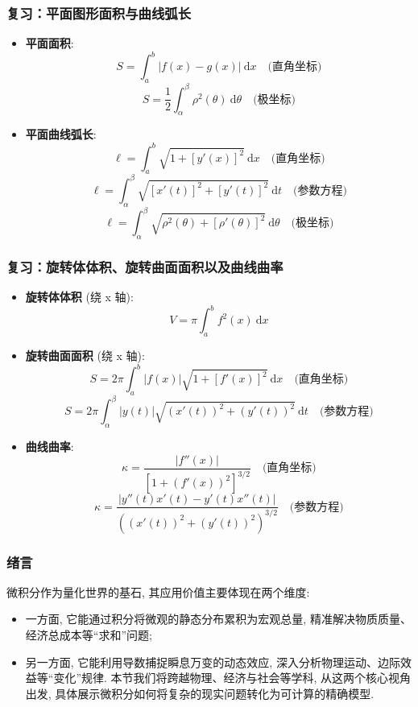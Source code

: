 \begin{frame}
\frametitle{复习：平面图形面积与曲线弧长}
\begin{itemize}
\item \textbf{平面面积}:
\[ S = \int_a^b |f(x)-g(x)| ~ \mathrm{d}x \quad \text{(直角坐标)} \]
\[ S = \frac{1}{2} \int_\alpha^\beta \rho^2(\theta) ~ \mathrm{d}\theta \quad \text{(极坐标)} \]
\item \textbf{平面曲线弧长}:
\[ \ell = \int_a^b \sqrt{1+[y'(x)]^2} ~ \mathrm{d}x \quad \text{(直角坐标)} \]
\[ \ell = \int_\alpha^\beta \sqrt{[x'(t)]^2+[y'(t)]^2} ~ \mathrm{d}t \quad \text{(参数方程)} \]
\[ \ell = \int_\alpha^\beta \sqrt{\rho^2(\theta)+[\rho'(\theta)]^2} ~ \mathrm{d}\theta \quad \text{(极坐标)} \]
\end{itemize}
\end{frame}


\begin{frame}
\frametitle{复习：旋转体体积、旋转曲面面积以及曲线曲率}
\begin{itemize}
\item \textbf{旋转体体积} (绕 x 轴):
\[ V = \pi \int_a^b f^2(x) ~ \mathrm{d}x \]
\item \textbf{旋转曲面面积} (绕 x 轴):
\[ S = 2\pi \int_a^b |f(x)| \sqrt{1+[f'(x)]^2} ~ \mathrm{d}x \quad \text{(直角坐标)} \]
\[ S = 2\pi \int_{\alpha}^{\beta} |y(t)| \sqrt{(x'(t))^2 + (y'(t))^2} ~ \mathrm{d} t \quad \text{(参数方程)} \]
\item \textbf{曲线曲率}:
\[ \kappa = \frac{|f''(x)|}{[1+(f'(x))^2]^{3/2}} \quad \text{(直角坐标)} \]
\[ \kappa = \frac{|y''(t)x'(t) - y'(t)x''(t)|}{\left((x'(t))^2 + (y'(t))^2\right)^{3/2}} \quad \text{(参数方程)} \]
\end{itemize}
\end{frame}


\begin{frame}
\frametitle{绪言}

{
\larger[1]

微积分作为量化世界的基石, 其应用价值主要体现在两个维度:
\begin{itemize}
\item 一方面, 它能通过积分将微观的静态分布累积为宏观总量, 精准解决物质质量、经济总成本等``求和''问题;
\item 另一方面, 它能利用导数捕捉瞬息万变的动态效应, 深入分析物理运动、边际效益等``变化''规律. 本节我们将跨越物理、经济与社会等学科, 从这两个核心视角出发, 具体展示微积分如何将复杂的现实问题转化为可计算的精确模型.
\end{itemize}
}

\end{frame}

